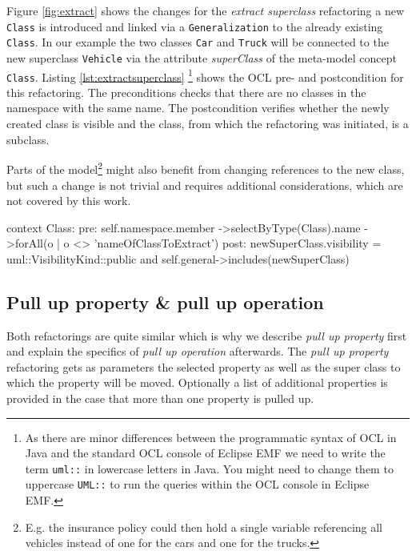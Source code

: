 \documentclass{llncs}
\begin{document}
Figure \ref{fig:extract} shows the changes for the \textit{extract superclass} refactoring a new \texttt{Class} is 
introduced and linked via a \texttt{Generalization} to the already existing \texttt{Class}. In our example the two 
classes \texttt{Car} and \texttt{Truck} will be connected to the new superclass \texttt{Vehicle} via the attribute 
\textit{superClass} of the meta-model concept \texttt{Class}. Listing \ref{lst:extractsuperclass}
\footnote{As there are minor differences between the programmatic syntax of OCL in Java and the standard OCL console of Eclipse EMF 
we need to write the term \texttt{uml::} in lowercase letters in Java. You might need to change them to uppercase \texttt{UML::} 
to run the queries within the OCL console in Eclipse EMF.} shows the OCL pre- and 
postcondition for this refactoring. The preconditions checks that there are no classes in the namespace with the 
same name. The postcondition verifies whether the newly created class is visible and the class, from which the refactoring was initiated,
is a subclass. 

Parts of the model\footnote{E.g. the insurance policy could then hold a single variable referencing all vehicles instead 
of one for the cars and one for the trucks.} might also benefit from changing references to the new class, but such a change is not 
trivial and requires additional considerations, which are not covered by this work.

\begin{lstsingle}[language=OCL,caption=OCL for \textit{extract superclass} refactoring,label=lst:extractsuperclass]
context Class:
pre:  self.namespace.member
        ->selectByType(Class).name
        ->forAll(o | o <> 'nameOfClassToExtract')
post: newSuperClass.visibility = uml::VisibilityKind::public
      and 
      self.general->includes(newSuperClass)
\end{lstsingle}


\subsection{Pull up property \& pull up operation}
\label{sec:pullup}
Both refactorings are quite similar which is why we describe \textit{pull up property} first and explain the specifics of \textit{pull up 
operation} afterwards. The \textit{pull up property} refactoring gets as parameters the selected property as well as the super class to 
which the property will be moved. Optionally a list of additional properties is provided in the case that more than one property is 
pulled up.
\end{document}
